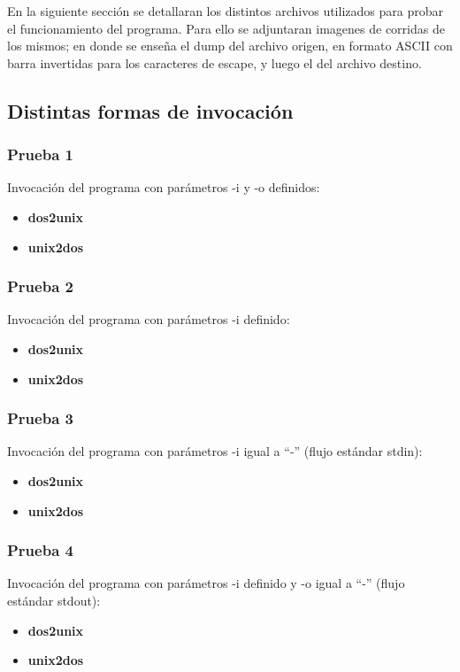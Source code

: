 \documentclass[a4paper,10pt]{article}
\begin{document}
En la siguiente secci\'on se detallaran los distintos archivos utilizados para probar el funcionamiento del
programa. Para ello se adjuntaran imagenes de corridas de los mismos; en donde se ense\~{n}a el dump del 
archivo origen, en formato ASCII con barra invertidas para los caracteres de escape, y luego el del 
archivo destino.

  \subsection{Distintas formas de invocaci\'on}
    \subsubsection{Prueba 1}
    Invocaci\'on del programa con par\'ametros -i y -o definidos:
    \begin{itemize}
      \item \textbf{dos2unix}
      \item \textbf{unix2dos}
    \end{itemize}

    \subsubsection{Prueba 2}
    Invocaci\'on del programa con par\'ametros -i definido:
    \begin{itemize}
      \item \textbf{dos2unix}
      \item \textbf{unix2dos}
    \end{itemize}
  
    \subsubsection{Prueba 3}
    Invocaci\'on del programa con par\'ametros -i igual a ``-'' (flujo est\'andar stdin):
      \begin{itemize}
      \item \textbf{dos2unix}
      \item \textbf{unix2dos}
      \end{itemize}

    \subsubsection{Prueba 4}
    Invocaci\'on del programa con par\'ametros -i definido y -o igual a ``-'' (flujo est\'andar stdout):
      \begin{itemize}
      \item \textbf{dos2unix}
      \item \textbf{unix2dos}
      \end{itemize}
\end{document}
